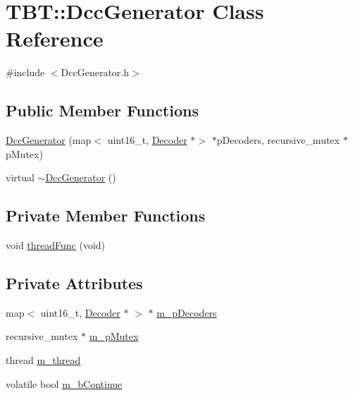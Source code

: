 \hypertarget{classTBT_1_1DccGenerator}{}\section{T\+BT\+:\+:Dcc\+Generator Class Reference}
\label{classTBT_1_1DccGenerator}


{\ttfamily \#include $<$Dcc\+Generator.\+h$>$}

\subsection*{Public Member Functions}
\begin{DoxyCompactItemize}
\item 
\hyperlink{classTBT_1_1DccGenerator_a42d23cfab6b78610d329f816ebfea5cf_a42d23cfab6b78610d329f816ebfea5cf}{Dcc\+Generator} (map$<$ uint16\+\_\+t, \hyperlink{classTBT_1_1Decoder}{Decoder} $\ast$$>$ $\ast$p\+Decoders, recursive\+\_\+mutex $\ast$p\+Mutex)
\item 
virtual \hyperlink{classTBT_1_1DccGenerator_afa84988600a4dbade4c76366131526dc_afa84988600a4dbade4c76366131526dc}{$\sim$\+Dcc\+Generator} ()
\end{DoxyCompactItemize}
\subsection*{Private Member Functions}
\begin{DoxyCompactItemize}
\item 
void \hyperlink{classTBT_1_1DccGenerator_ac2053051903fef00b69152184fa6f47d_ac2053051903fef00b69152184fa6f47d}{thread\+Func} (void)
\end{DoxyCompactItemize}
\subsection*{Private Attributes}
\begin{DoxyCompactItemize}
\item 
map$<$ uint16\+\_\+t, \hyperlink{classTBT_1_1Decoder}{Decoder} $\ast$ $>$ $\ast$ \hyperlink{classTBT_1_1DccGenerator_a1cc367d051ac114a03e5295bb4bb7b11_a1cc367d051ac114a03e5295bb4bb7b11}{m\+\_\+p\+Decoders}
\item 
recursive\+\_\+mutex $\ast$ \hyperlink{classTBT_1_1DccGenerator_a34515e4cb877858341e0a7c5aa55e5fc_a34515e4cb877858341e0a7c5aa55e5fc}{m\+\_\+p\+Mutex}
\item 
thread \hyperlink{classTBT_1_1DccGenerator_a555d6682492a52065f326a1e02451886_a555d6682492a52065f326a1e02451886}{m\+\_\+thread}
\item 
volatile bool \hyperlink{classTBT_1_1DccGenerator_a0d045ceb64e3ceece497459776d7d504_a0d045ceb64e3ceece497459776d7d504}{m\+\_\+b\+Continue}
\end{DoxyCompactItemize}


